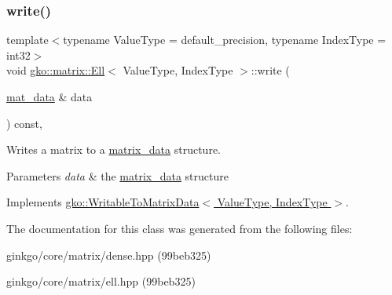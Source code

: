 \subsubsection{\texorpdfstring{write()}{write()}}
{\footnotesize\ttfamily template$<$typename Value\+Type = default\+\_\+precision, typename Index\+Type = int32$>$ \\
void \hyperlink{classgko_1_1matrix_1_1Ell}{gko\+::matrix\+::\+Ell}$<$ Value\+Type, Index\+Type $>$\+::write (\begin{DoxyParamCaption}\item[{\hyperlink{structgko_1_1matrix__data}{mat\+\_\+data} \&}]{data }\end{DoxyParamCaption}) const\hspace{0.3cm}{\ttfamily [override]}, {\ttfamily [virtual]}}



Writes a matrix to a \hyperlink{structgko_1_1matrix__data}{matrix\+\_\+data} structure. 


\begin{DoxyParams}{Parameters}
{\em data} & the \hyperlink{structgko_1_1matrix__data}{matrix\+\_\+data} structure \\
\hline
\end{DoxyParams}


Implements \hyperlink{classgko_1_1WritableToMatrixData_a96036c3a4bf4c67fa93002808b8b14e2}{gko\+::\+Writable\+To\+Matrix\+Data$<$ Value\+Type, Index\+Type $>$}.



The documentation for this class was generated from the following files\+:\begin{DoxyCompactItemize}
\item 
ginkgo/core/matrix/dense.\+hpp (99beb325)\item 
ginkgo/core/matrix/ell.\+hpp (99beb325)\end{DoxyCompactItemize}
